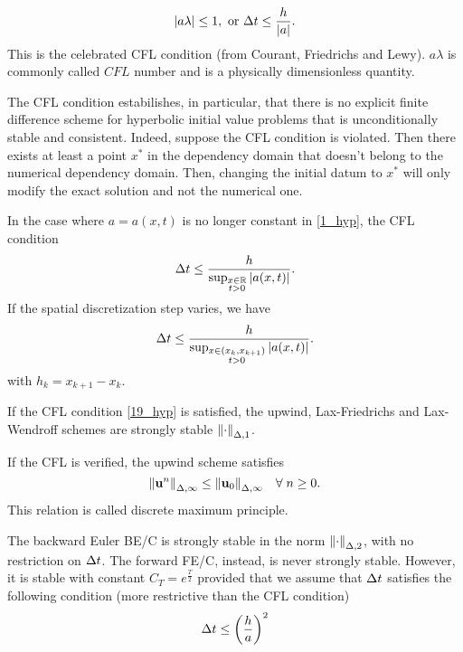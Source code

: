 \begin{equation}
    \abs{a\lambda} \leq 1, \text{ or } \Delta t \leq \frac{h}{\abs{a}}.
    \label{19_hyp}
\end{equation}
This is the celebrated CFL condition (from Courant, Friedrichs and Lewy). \(a\lambda\) is commonly called \(CFL\) number and is a physically dimensionless quantity.
\begin{remark}
    The CFL condition estabilishes, in particular, that there is no explicit finite difference scheme for hyperbolic initial value problems that is unconditionally stable and consistent. Indeed, suppose the CFL condition is violated. Then there exists at least a point \(x^*\) in the dependency domain that doesn't belong to the numerical dependency domain. Then, changing the initial datum to \(x^*\) will only modify the exact solution and not the numerical one.
\end{remark}
\begin{remark}
    In the case where \(a = a(x,t)\) is no longer constant in \eqref{1_hyp}, the CFL condition 
    \[
        \Delta t \leq \frac{h}{\sup_{\substack{x\in \mathbb{R} \\ t > 0}} \abs{a(x,t)}}.
    \]
    If the spatial discretization step varies, we have 
    \[
        \Delta t \leq \frac{h}{\sup_{\substack{x\in (x_k, x_{k+1}) \\ t > 0}} \abs{a(x,t)}}.
    \]
    with \(h_k = x_{k+1} - x_k\).
\end{remark}
\begin{theorem}
    If the CFL condition \eqref{19_hyp} is satisfied, the upwind, Lax-Friedrichs and Lax-Wendroff schemes are strongly stable \(\norm{\cdot}_{\Delta,1}\).
\end{theorem}
\begin{theorem}
    If the CFL is verified, the upwind scheme satisfies
    \begin{equation}
        \norm{\textbf{u}^n}_{\Delta, \infty} \leq \norm{\textbf{u}_0}_{\Delta, \infty} \quad \forall \; n \geq 0.
        \label{20_hyp}
    \end{equation}
    This relation is called discrete maximum principle.
\end{theorem}
\begin{theorem}
    The backward Euler BE/C is strongly stable in the norm \(\norm{\cdot}_{\Delta, 2}\), with no restriction on \(\Delta t\). The forward FE/C, instead, is never strongly stable. However, it is stable with constant \(C_T = e^{\frac{T}{2}}\) provided that we assume that \(\Delta t\) satisfies the following condition (more restrictive than the CFL condition)
    \begin{equation}
        \Delta t \leq \left( \frac{h}{a} \right)^2
        \label{21_hyp}
    \end{equation}  
\end{theorem}
